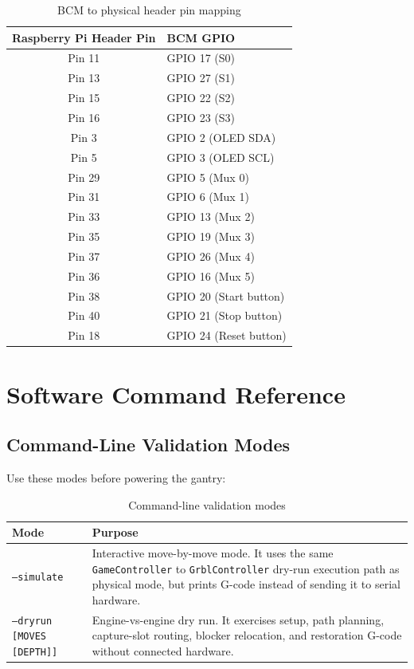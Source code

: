 \documentclass[11pt,a4paper]{report}
\begin{document}
\begin{table}[H]
\centering
\begin{tabular}{cl}
\toprule
\textbf{Raspberry Pi Header Pin} & \textbf{BCM GPIO} \\
\midrule
Pin 11 & GPIO 17 (S0) \\
Pin 13 & GPIO 27 (S1) \\
Pin 15 & GPIO 22 (S2) \\
Pin 16 & GPIO 23 (S3) \\
Pin 3 & GPIO 2 (OLED SDA) \\
Pin 5 & GPIO 3 (OLED SCL) \\
Pin 29 & GPIO 5 (Mux 0) \\
Pin 31 & GPIO 6 (Mux 1) \\
Pin 33 & GPIO 13 (Mux 2) \\
Pin 35 & GPIO 19 (Mux 3) \\
Pin 37 & GPIO 26 (Mux 4) \\
Pin 36 & GPIO 16 (Mux 5) \\
Pin 38 & GPIO 20 (Start button) \\
Pin 40 & GPIO 21 (Stop button) \\
Pin 18 & GPIO 24 (Reset button) \\
\bottomrule
\end{tabular}
\caption{BCM to physical header pin mapping}
\end{table}


\chapter{Software Command Reference}

\section{Command-Line Validation Modes}

Use these modes before powering the gantry:

\begin{table}[H]
\centering
\begin{tabular}{p{5cm}p{9cm}}
\toprule
\textbf{Mode} & \textbf{Purpose} \\
\midrule
\texttt{--simulate} & Interactive move-by-move mode. It uses the same \texttt{GameController} to \texttt{GrblController} dry-run execution path as physical mode, but prints G-code instead of sending it to serial hardware. \\
\addlinespace
\texttt{--dryrun [MOVES [DEPTH]]} & Engine-vs-engine dry run. It exercises setup, path planning, capture-slot routing, blocker relocation, and restoration G-code without connected hardware. \\
\bottomrule
\end{tabular}
\caption{Command-line validation modes}
\end{table}
\end{document}
